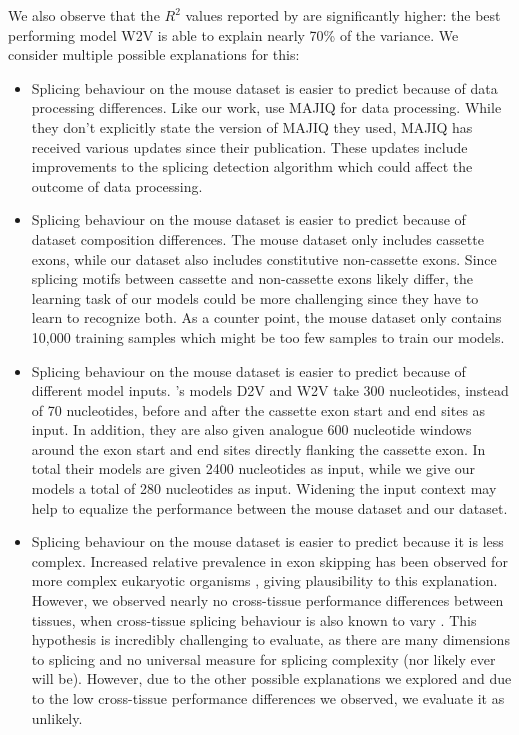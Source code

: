 
We also observe that the $R^2$ values reported by \cite{d2vsplicing} are significantly higher: the best performing model W2V is able to explain nearly 70\% of the variance. We consider multiple possible explanations for this: 
\begin{itemize}
	\item Splicing behaviour on the mouse dataset is easier to predict because of data processing differences. Like our work, \cite{d2vsplicing} use MAJIQ for data processing. While they don't explicitly state the version of MAJIQ they used, MAJIQ has received various updates since their publication. These updates include improvements to the splicing detection algorithm which could affect the outcome of data processing. 
	\item Splicing behaviour on the mouse dataset is easier to predict because of dataset composition differences. The mouse dataset only includes cassette exons, while our dataset also includes constitutive non-cassette exons. Since splicing motifs between cassette and non-cassette exons likely differ, the learning task of our models could be more challenging since they have to learn to recognize both. As a counter point, the mouse dataset only contains 10,000 training samples which might be too few samples to train our models.

	

	\item Splicing behaviour on the mouse dataset is easier to predict because of different model inputs. \cite{d2vsplicing}'s models D2V and W2V take 300 nucleotides, instead of 70 nucleotides, before and after the cassette exon start and end sites as input. In addition, they are also given analogue 600 nucleotide windows around the exon start and end sites directly flanking the cassette exon. In total their models are given 2400 nucleotides as input, while we give our models a total of 280 nucleotides as input. Widening the input context may help to equalize the performance between the mouse dataset and our dataset. 
	\item Splicing behaviour on the mouse dataset is easier to predict because it is less complex. Increased relative prevalence in exon skipping has been observed for more complex eukaryotic organisms \cite{splicing_current_perspectives}, giving plausibility to this explanation. However, we observed nearly no cross-tissue performance differences between tissues, when cross-tissue splicing behaviour is also known to vary \cite{crosstissuesplicing}. This hypothesis is incredibly challenging to evaluate, as there are many dimensions to splicing and no universal measure for splicing complexity (nor likely ever will be). However, due to the other possible explanations we explored and due to the low cross-tissue performance differences we observed, we evaluate it as unlikely.
	

\end{itemize}
